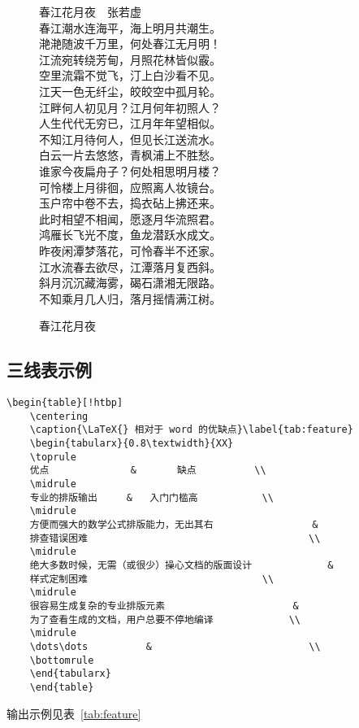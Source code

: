 \documentclass[timesfont,no-math]{JXUSTmodeling}%
\begin{document}
	\begin{figure}[!htbp]
		\centering\kaishu
				春江花月夜~~张若虚\\
		春江潮水连海平，海上明月共潮生。\\
		滟滟随波千万里，何处春江无月明！\\
		江流宛转绕芳甸，月照花林皆似霰。\\
		空里流霜不觉飞，汀上白沙看不见。\\
		江天一色无纤尘，皎皎空中孤月轮。\\
		江畔何人初见月？江月何年初照人？\\
		人生代代无穷已，江月年年望相似。\\
		不知江月待何人，但见长江送流水。\\
		白云一片去悠悠，青枫浦上不胜愁。\\
		谁家今夜扁舟子？何处相思明月楼？\\
		可怜楼上月徘徊，应照离人妆镜台。\\
		玉户帘中卷不去，捣衣砧上拂还来。\\
		此时相望不相闻，愿逐月华流照君。\\
		鸿雁长飞光不度，鱼龙潜跃水成文。\\
		昨夜闲潭梦落花，可怜春半不还家。\\
		江水流春去欲尽，江潭落月复西斜。\\
		斜月沉沉藏海雾，碣石潇湘无限路。\\
		不知乘月几人归，落月摇情满江树。\\
		\caption{春江花月夜}\label{fig:poem}
	\end{figure}
	\clearpage
	\subsection{三线表示例}
	\begin{lstlisting}[language={[LaTeX]TeX},caption={\LaTeX{} 代码},label={lst:tab}]
	\begin{table}[!htbp]
	\centering
	\caption{\LaTeX{} 相对于 word 的优缺点}\label{tab:feature}
	\begin{tabularx}{0.8\textwidth}{XX}
	\toprule
	优点				&		缺点			\\
	\midrule
	专业的排版输出		&	入门门槛高			\\
	\midrule
	方便而强大的数学公式排版能力，无出其右					&
	排查错误困难										\\
	\midrule
	绝大多数时候，无需（或很少）操心文档的版面设计				&
	样式定制困难								\\
	\midrule
	很容易生成复杂的专业排版元素						&
	为了查看生成的文档，用户总要不停地编译				\\
	\midrule
	\dots\dots			&							\\
	\bottomrule
	\end{tabularx}		
	\end{table}
	\end{lstlisting}
	输出示例见表~\ref{tab:feature}
	
\end{document}
